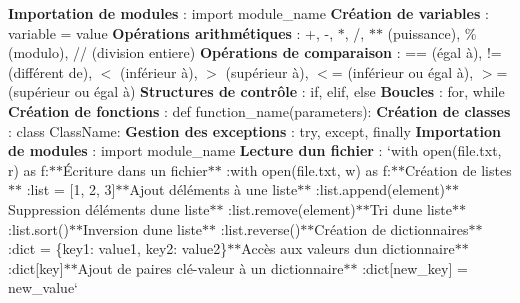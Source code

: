 {\bfseries Importation de modules} \+: {\ttfamily import module\+\_\+name} {\bfseries Création de variables} \+: {\ttfamily variable = value} {\bfseries Opérations arithmétiques} \+: {\ttfamily +}, {\ttfamily -\/}, {\ttfamily $\ast$}, {\ttfamily /}, {\ttfamily $\ast$$\ast$} (puissance), {\ttfamily \%} (modulo), {\ttfamily //} (division entiere) {\bfseries Opérations de comparaison} \+: {\ttfamily ==} (égal à), {\ttfamily !=} (différent de), {\ttfamily $<$} (inférieur à), {\ttfamily $>$} (supérieur à), {\ttfamily $<$=} (inférieur ou égal à), {\ttfamily $>$=} (supérieur ou égal à) {\bfseries Structures de contrôle} \+: {\ttfamily if}, {\ttfamily elif}, {\ttfamily else} {\bfseries Boucles} \+: {\ttfamily for}, {\ttfamily while} {\bfseries Création de fonctions} \+: {\ttfamily def function\+\_\+name(parameters)\+:} {\bfseries Création de classes} \+: {\ttfamily class Class\+Name\+:} {\bfseries Gestion des exceptions} \+: {\ttfamily try}, {\ttfamily except}, {\ttfamily finally} {\bfseries Importation de modules} \+: {\ttfamily import module\+\_\+name} {\bfseries Lecture d\textquotesingle{}un fichier} \+: `with open(\textquotesingle{}file.\+txt\textquotesingle{}, \textquotesingle{}r\textquotesingle{}) as f\+:{\ttfamily  $\ast$$\ast$Écriture dans un fichier$\ast$$\ast$ \+:}with open(\textquotesingle{}file.\+txt\textquotesingle{}, \textquotesingle{}w\textquotesingle{}) as f\+:{\ttfamily  $\ast$$\ast$\+Création de listes$\ast$$\ast$ \+:}list = \mbox{[}1, 2, 3\mbox{]}{\ttfamily  $\ast$$\ast$\+Ajout d\textquotesingle{}éléments à une liste$\ast$$\ast$ \+:}list.\+append(element){\ttfamily  $\ast$$\ast$\+Suppression d\textquotesingle{}éléments d\textquotesingle{}une liste$\ast$$\ast$ \+:}list.\+remove(element){\ttfamily  $\ast$$\ast$\+Tri d\textquotesingle{}une liste$\ast$$\ast$ \+:}list.\+sort(){\ttfamily  $\ast$$\ast$\+Inversion d\textquotesingle{}une liste$\ast$$\ast$ \+:}list.\+reverse(){\ttfamily  $\ast$$\ast$\+Création de dictionnaires$\ast$$\ast$ \+:}dict = \{\textquotesingle{}key1\textquotesingle{}\+: \textquotesingle{}value1\textquotesingle{}, \textquotesingle{}key2\textquotesingle{}\+: \textquotesingle{}value2\textquotesingle{}\}{\ttfamily  $\ast$$\ast$\+Accès aux valeurs d\textquotesingle{}un dictionnaire$\ast$$\ast$ \+:}dict\mbox{[}\textquotesingle{}key\textquotesingle{}\mbox{]}{\ttfamily  $\ast$$\ast$\+Ajout de paires clé-\/valeur à un dictionnaire$\ast$$\ast$ \+:}dict\mbox{[}\textquotesingle{}new\+\_\+key\textquotesingle{}\mbox{]} = \textquotesingle{}new\+\_\+value\textquotesingle{}` 